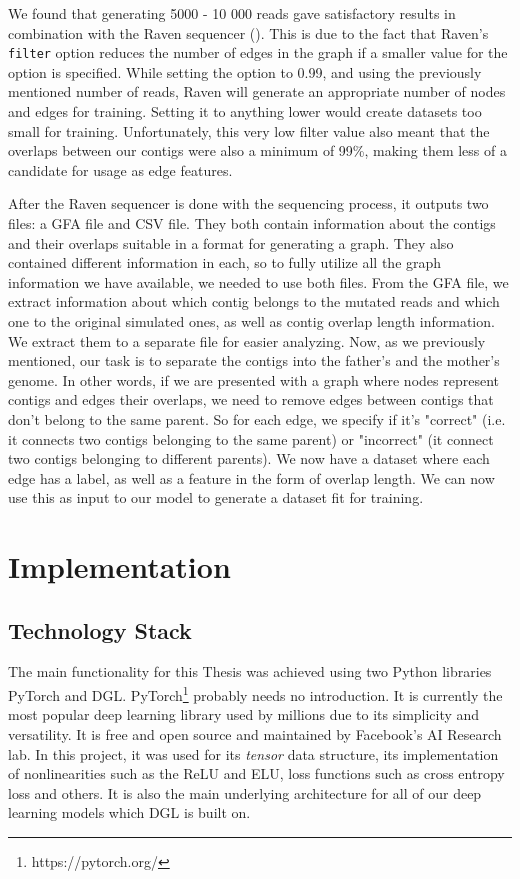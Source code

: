 \documentclass[times, utf8, diplomski, english]{fer_eng}
\begin{document}
We found that generating 5000 - 10 000 reads gave satisfactory results in combination with the Raven sequencer (\cite{Vaser}). This is due to the fact that Raven's \texttt{filter} option reduces the number of edges in the graph if a smaller value for the option is specified. While setting the option to 0.99, and using the previously mentioned number of reads, Raven will generate an appropriate number of nodes and edges for training. Setting it to anything lower would create datasets too small for training. Unfortunately, this very low filter value also meant that the overlaps between our contigs were also a minimum of 99\%, making them less of a candidate for usage as edge features.

After the Raven sequencer is done with the sequencing process, it outputs two files: a GFA file and CSV file. They both contain information about the contigs and their overlaps suitable in a format for generating a graph. They also contained different information in each, so to fully utilize all the graph information we have available, we needed to use both files. From the GFA file, we extract information about which contig belongs to the mutated reads and which one to the original simulated ones, as well as contig overlap length information. We extract them to a separate file for easier analyzing. Now, as we previously mentioned, our task is to separate the contigs into the father's and the mother's genome. In other words, if we are presented with a graph where nodes represent contigs and edges their overlaps, we need to remove edges between contigs that don't belong to the same parent. So for each edge, we specify if it's "correct" (i.e. it connects two contigs belonging to the same parent) or "incorrect" (it connect two contigs belonging to different parents). We now have a dataset where each edge has a label, as well as a feature in the form of overlap length. We can now use this as input to our model to generate a dataset fit for training.

\chapter{Implementation}

\section{Technology Stack}

The main functionality for this Thesis was achieved using two Python libraries PyTorch and DGL. PyTorch\footnote{https://pytorch.org/} probably needs no introduction. It is currently the most popular deep learning library used by millions due to its simplicity and versatility. It is free and open source and maintained by Facebook's AI Research lab. In this project, it was used for its \textit{tensor} data structure, its implementation of nonlinearities such as the ReLU and ELU, loss functions such as cross entropy loss and others. It is also the main underlying architecture for all of our deep learning models which DGL is built on.
\end{document}
